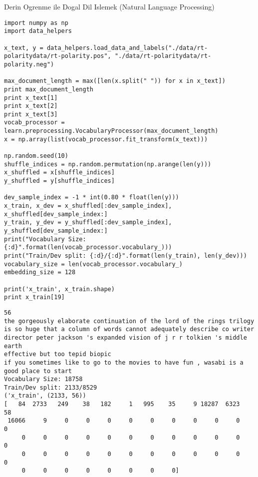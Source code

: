 \documentclass[12pt,fleqn]{article}\usepackage{../../common}
\begin{document}
Derin Ogrenme ile Dogal Dil Islemek (Natural Language Processing)

\begin{verbatim}
import numpy as np
import data_helpers

x_text, y = data_helpers.load_data_and_labels("./data/rt-polaritydata/rt-polarity.pos", "./data/rt-polaritydata/rt-polarity.neg")

max_document_length = max([len(x.split(" ")) for x in x_text])
print max_document_length
print x_text[1]
print x_text[2]
print x_text[3]
vocab_processor = learn.preprocessing.VocabularyProcessor(max_document_length)
x = np.array(list(vocab_processor.fit_transform(x_text)))

np.random.seed(10)
shuffle_indices = np.random.permutation(np.arange(len(y)))
x_shuffled = x[shuffle_indices]
y_shuffled = y[shuffle_indices]

dev_sample_index = -1 * int(0.80 * float(len(y)))
x_train, x_dev = x_shuffled[:dev_sample_index], x_shuffled[dev_sample_index:]
y_train, y_dev = y_shuffled[:dev_sample_index], y_shuffled[dev_sample_index:]
print("Vocabulary Size: {:d}".format(len(vocab_processor.vocabulary_)))
print("Train/Dev split: {:d}/{:d}".format(len(y_train), len(y_dev)))
vocabulary_size = len(vocab_processor.vocabulary_)
embedding_size = 128

print('x_train', x_train.shape)
print x_train[19]
\end{verbatim}

\begin{verbatim}
56
the gorgeously elaborate continuation of the lord of the rings trilogy is so huge that a column of words cannot adequately describe co writer director peter jackson 's expanded vision of j r r tolkien 's middle earth
effective but too tepid biopic
if you sometimes like to go to the movies to have fun , wasabi is a good place to start
Vocabulary Size: 18758
Train/Dev split: 2133/8529
('x_train', (2133, 56))
[   84  2733   249    38   182     1   995    35     9 18287  6323    58
 16066     9     0     0     0     0     0     0     0     0     0     0
     0     0     0     0     0     0     0     0     0     0     0     0
     0     0     0     0     0     0     0     0     0     0     0     0
     0     0     0     0     0     0     0     0]
\end{verbatim}
\end{document}
